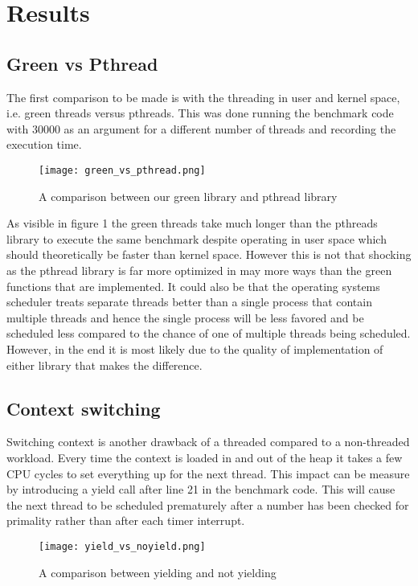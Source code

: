 \documentclass[a4paper,10pt]{article}
\begin{document}
\section*{Results}
\subsection*{Green vs Pthread}
The first comparison to be made is with the threading in user and kernel space, i.e. green threads versus pthreads. This was done running the benchmark code with 30000 as an argument for a different number of threads and recording the execution time.\\
\begin{figure}[htp]
    \centering
    \texttt{[image: green\_vs\_pthread.png]}
    \caption{A comparison between our green library and pthread library}
    \label{fig:graph}
\end{figure}

\noindent As visible in figure 1 the green threads take much longer than the pthreads library to execute the same benchmark despite operating in user space which should theoretically be faster than kernel space. However this is not that shocking as the pthread library is far more optimized in may more ways than the green functions that are implemented. It could also be that the operating systems scheduler treats separate threads better than a single process that contain multiple threads and hence the single process will be less favored and be scheduled less compared to the chance of one of multiple threads being scheduled. However, in the end it is most likely due to the quality of implementation of either library that makes the difference.
\newpage
\subsection*{Context switching}
Switching context is another drawback of a threaded compared to a non-threaded workload. Every time the context is loaded in and out of the heap it takes a few CPU cycles to set everything up for the next thread. This impact can be measure by introducing a yield call after line 21 in the benchmark code. This will cause the next thread to be scheduled prematurely after a number has been checked for primality rather than after each timer interrupt.

\begin{figure}[htp]
    \centering
    \texttt{[image: yield\_vs\_noyield.png]}
    \caption{A comparison between yielding and not yielding}
    \label{fig:graph}
\end{figure}
\end{document}
